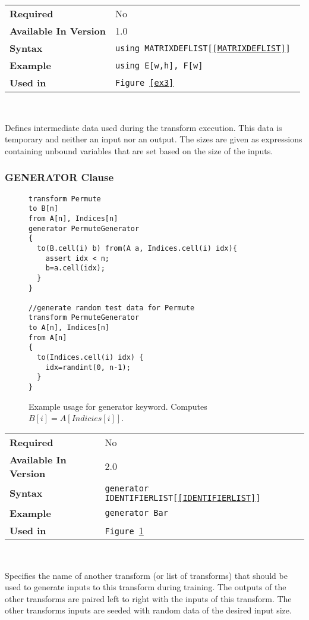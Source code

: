 \documentclass[11pt]{article}
\begin{document}
\begin{tabular}{| l | l |}
\hline
\bf Required & No                          \\
\bf Available In Version & 1.0             \\
\bf Syntax & \tt using MATRIXDEFLIST[\ref{MATRIXDEFLIST}]     \\
\bf Example & \tt using E[w,h], F[w]     \\
\bf Used in & \tt Figure~\ref{ex3}      \\
\hline
\end{tabular}

~

\noindent Defines intermediate data used during the transform execution. This
data is temporary and neither an input nor an output.  The sizes are given
as expressions containing unbound variables that are set based on the size
of the inputs.

\subsubsection{GENERATOR Clause}

\begin{figure}[htb]
\begin{lstlisting}
transform Permute
to B[n]
from A[n], Indices[n]
generator PermuteGenerator
{
  to(B.cell(i) b) from(A a, Indices.cell(i) idx){
    assert idx < n;
    b=a.cell(idx);
  }
}

//generate random test data for Permute
transform PermuteGenerator 
to A[n], Indices[n]
from A[n]
{
  to(Indices.cell(i) idx) {
    idx=randint(0, n-1);
  }
}
\end{lstlisting}
  \caption{
  Example usage for generator keyword.  Computes $B[i]=A[Indicies[i]]$.
  \label{ex4}
  }
\end{figure}

\begin{tabular}{| l | l |}
\hline
\bf Required & No \\
\bf Available In Version & 2.0            \\
\bf Syntax & \tt generator IDENTIFIERLIST[\ref{IDENTIFIERLIST}]\\
\bf Example & \tt generator Bar\\
\bf Used in & \tt Figure~\ref{ex4}      \\
\hline
\end{tabular}

~

\noindent Specifies the name of another transform (or list of transforms)
that should be used to generate inputs to this transform during training.
The outputs of the other transforms are paired left to right with the inputs
of this transform.  The other transforms inputs are seeded with random data
of the desired input size.
\end{document}
